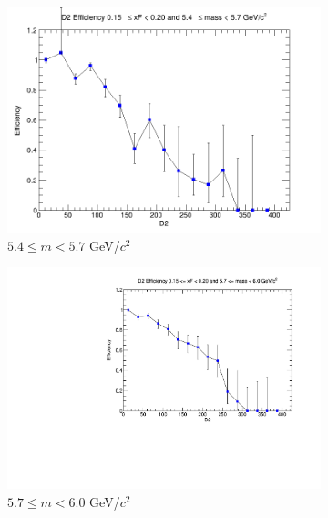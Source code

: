 \documentclass[11pt]{article}
\begin{document}
\begin{figure}[p]
\begin{subfigure}[b]{0.32\textwidth}
        \includegraphics[width=\textwidth]{./kTrackerEfficiencyPlots/D2_Efficiency_xF3_mass4.png}
        \caption{$5.4 \leq m < 5.7$ GeV/$c^2$}
    \end{subfigure}\hfill
    \begin{subfigure}[b]{0.32\textwidth}
        \centering
        \includegraphics[width=\textwidth]{./kTrackerEfficiencyPlots/D2_Efficiency_xF3_mass5.pdf}
        \caption{$5.7 \leq m < 6.0$ GeV/$c^2$}
    \end{subfigure}\vspace{0.5cm}
    \begin{subfigure}[b]{0.32\textwidth}
        \centering

\end{subfigure}
\end{figure}
\end{document}
